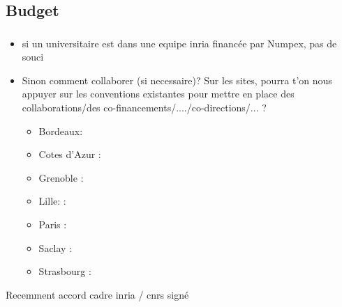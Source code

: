 \subsection{Budget}

\begin{frame}
  \frametitle{\insertsectionhead}
  \framesubtitle{\insertsubsectionhead}
  \begin{itemize}
    \item si un universitaire est dans une equipe inria financée par Numpex, pas de souci
    \item Sinon comment collaborer (si necessaire)? Sur les sites, pourra t'on nous appuyer sur les conventions existantes pour 
    mettre en place des collaborations/des co-financements/..../co-directions/... ?
    \begin{itemize}
      \item Bordeaux: 
      \item Cotes d'Azur : 
      \item Grenoble : 
      \item Lille:  : 
      \item Paris : 
      \item Saclay : 
      \item Strasbourg : 
    \end{itemize}
  \end{itemize}
  \alert{Recemment accord cadre inria / cnrs signé}

\end{frame}

